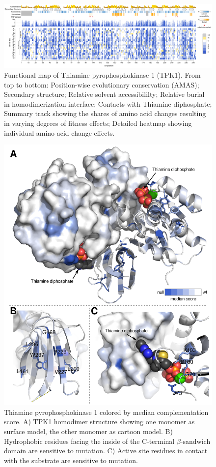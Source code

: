 \begin{landscape}
\begin{figure}[h!]
	\centering
	\includegraphics[width=9in]{img/tpk1-map.pdf}
	\caption{Functional map of Thiamine pyrophosphokinase 1 (TPK1). From top to bottom: Position-wise evolutionary conservation (AMAS); Secondary structure; Relative solvent accessibililty; Relative burial in homodimerization interface; Contacts with Thiamine diphosphate; Summary track showing the shares of amino acid changes resulting in varying degrees of fitness effects; Detailed heatmap showing individual amino acid change effects.}
	\label{fig:tpk1_structure}
\end{figure}
\end{landscape}

\begin{figure}[h!]
	\centering
	\includegraphics[width=.8\textwidth]{img/tpk1_structure.pdf}
	\caption{Thiamine pyrophosphokinase 1 colored by median complementation score. A) TPK1 homodimer structure showing one monomer as surface model, the other monomer as cartoon model. B) Hydrophobic residues facing the inside of the C-terminal $\beta$-sandwich domain are sensitive to mutation. C) Active site residues in contact with the substrate are sensitive to mutation.}
	\label{fig:tpk1-map}
\end{figure}


